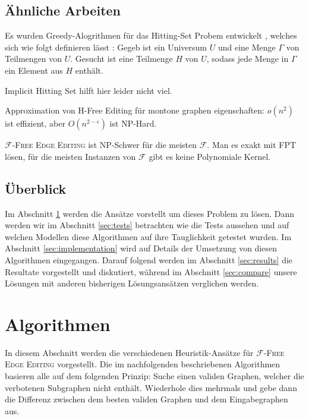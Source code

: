 \documentclass[12pt,a4paper,onecolumn,oneside,titlepage]{article}
\newcommand\cursive[1]{\ensuremath{\mathcal{#1}}}
\begin{document}



\subsection{Ähnliche Arbeiten}
Es wurden Greedy-Alogrithmen für das Hitting-Set Probem entwickelt \cite{Moreno13}, welches sich wie folgt definieren lässt \cite{Karp72}: Gegeb ist ein Universum $U$ und eine Menge $\Gamma$ von Teilmengen von $U$. Gesucht ist eine Teilmenge $H$ von $U$, sodass jede Menge in $\Gamma$ ein Element aus $H$ enthält.
  

Implicit Hitting Set hilft hier leider nicht viel.\cite{Moreno13} 

Approximation von H-Free Editing für montone graphen eigenschaften: $o(n^2)$ ist effizient, aber $O(n^{2-\epsilon})$ ist NP-Hard.\cite{Alon09}

\textsc{\cursive{F}-Free Edge Editing} ist NP-Schwer für die meisten \cursive{F}. Man es exakt mit FPT lösen\cite{Cai96}, für die meisten Instanzen von \cursive{F} gibt es keine Polynomiale Kernel.


\subsection{Überblick}
Im Abschnitt \ref{sec:algos} werden die Ansätze vorstellt um dieses Problem zu lösen. Dann werden wir im Abschnitt \ref{sec:tests} betrachten wie die Tests aussehen und auf welchen Modellen diese Algorithmen auf ihre Tauglichkeit getestet wurden. Im Abschnitt \ref{sec:implementation} wird auf Details der Umsetzung von diesen Algorithmen eingegangen. Darauf folgend werden im Abschnitt \ref{sec:results} die Resultate vorgestellt und diskutiert, während im Abschnitt \ref{sec:compare} unsere Lösungen mit anderen bisherigen Lösungsansätzen verglichen werden.

\section{Algorithmen}

\label{sec:algos}

In diesem Abschnitt werden die verschiedenen Heuristik-Ansätze für \textsc{\cursive{F}-Free Edge Editing} vorgestellt.
Die im nachfolgenden beschriebenen Algorithmen basieren alle auf dem folgenden Prinzip: Suche einen validen Graphen, welcher die verbotenen Subgraphen nicht enthält. Wiederhole dies mehrmals und gebe dann die Differenz zwischen dem besten validen Graphen und dem Eingabegraphen aus.
\end{document}
